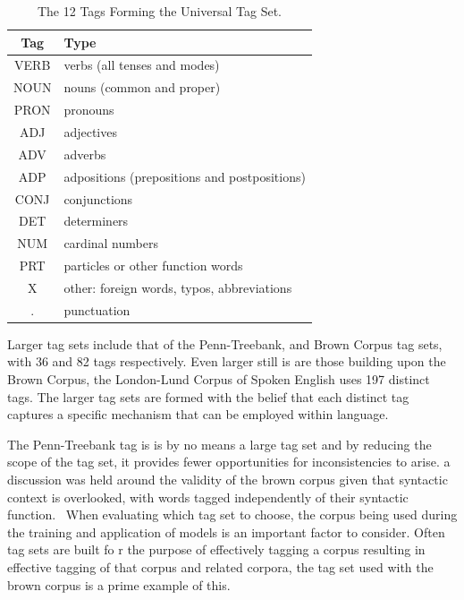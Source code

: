 \documentclass[10pt]{report}
\begin{document}
\renewcommand{\baselinestretch}{1.0}\normalsize
\renewcommand{\arraystretch}{1.0}
\begin{table}[h!]
  \centering
  \begin{tabular}{c | l}
    Tag & Type \\
    \hline
VERB & verbs (all tenses and modes)\\
NOUN & nouns (common and proper)\\
PRON & pronouns \\
ADJ & adjectives\\
ADV & adverbs\\
ADP & adpositions (prepositions and postpositions)\\
CONJ & conjunctions\\
DET & determiners\\
NUM & cardinal numbers\\
PRT & particles or other function words\\
X & other: foreign words, typos, abbreviations\\
. & punctuation\\
  \end{tabular}
  \caption{The 12 Tags Forming the Universal Tag Set.\label{tab:universal_tags}}
\end{table}
\renewcommand{\baselinestretch}{2.0}\normalsize
\renewcommand{\arraystretch}{1.0}

Larger tag sets include that of the Penn-Treebank, and Brown Corpus tag sets, with 36 and 82 tags respectively. Even larger still is are those building upon the Brown Corpus, the London-Lund Corpus
of Spoken English uses 197 distinct tags. The larger tag sets are formed with the belief that each distinct tag captures a specific mechanism that can be employed within language. ~\cite{garside1988computational}

The Penn-Treebank tag is is by no means a large tag set and by reducing the scope of the tag set, it provides fewer opportunities for inconsistencies to arise. a discussion was held around the validity of the brown corpus given that syntactic context is overlooked, with words tagged independently of their syntactic function.~\cite{Marcus1993-tw} When evaluating which tag set to choose, the corpus being used during the training and application of models is an important factor to consider. Often tag sets are built fo
r the purpose of effectively tagging a corpus resulting in effective tagging of that corpus and related corpora, the tag set used with the brown corpus is a prime example of this.
\end{document}
